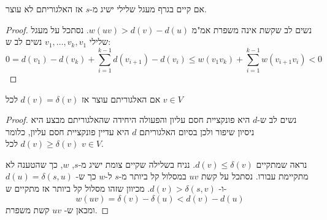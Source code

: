 \begin{claim}
אם קיים בגרף מעגל שלילי ישיג מ-$s$ אז האלגוריתם לא עוצר.
\end{claim}
\begin{proof}
נשים לב שקשת אינה משפרת אמ"מ 
$w(uv) > d(v) - d(u)$.
נסתכל על מעגל שלילי
$v_1, \ldots, v_k, v_1$
נשים לב ש:
$$
0 = 
d(v_1) - d(v_k) + \sum_{i=1}^{k-1} d(v_{i + 1}) - d(v_{i})
\leq
w(v_1v_k) + \sum_{i=1}^{k-1} w(v_{i+1}v_i) < 0
$$
\end{proof}



\begin{claim}
אם האלגוריתם עוצר אז 
$d(v) = \delta(v)$
לכל
$v \in V$
\end{claim}
\begin{proof}
נשים לב ש-$d$ היא פונקציית חסם עליון והפעולה היחידה שהאלגוריתם מבצע היא ניסיון שיפור ולכן
בסיום האלגוריתם $d$ היא עדיין פונקציית חסם עליון, כלומר 
$d(v) \geq \delta(v)$
לכל
$v \in V$.

נראה שמתקיים 
$d(v) \leq \delta(v)$.
נניח בשלילה שקיים צומת ישיג מ-$s$,
$w$,
כך שהטענה לא מתקיימת עבורו.
נסתכל על קשת 
$uv$
במסלול קל ביותר מ-$s$ ל-$w$
כך ש-%
$d(u) = \delta(s,u)$
ו-%
$d(v) > \delta(s,v)$.
מכיוון שזהו מסלול קל ביותר אז מתקיים ש-%
$$w(uv) = \delta(v) - \delta(u) < d(v) - d(u)$$
ומכאן ש-%
$uv$
קשת משפרת.

\end{proof}
